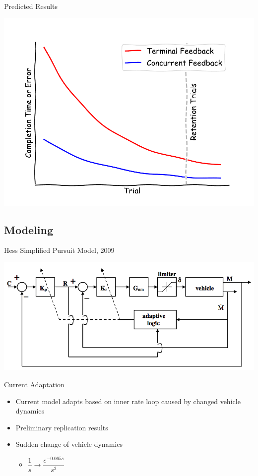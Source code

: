\documentclass[10pt]{beamer}
\begin{document}
\begin{frame}[fragile]{Predicted Results}
  \begin{center}
    \includegraphics[width=\linewidth]{../img/robot_estimate.pdf}
  \end{center}
\end{frame}

\subsection{Modeling}

\begin{frame}[fragile]{Hess Simplified Pursuit Model, 2009~\cite{Hess2009}}
  \begin{center}
    \includegraphics[width=\linewidth]{./../img/Screen_Shot_2018-08-09_at_4.15.24_PM.png}
  \end{center}
\end{frame}

\begin{frame}[fragile]{Current Adaptation}
  \begin{itemize}
    \setlength\itemsep{1em}
    \item Current model adapts based on inner rate loop caused by changed vehicle dynamics
    \item Preliminary replication results
    \item Sudden change of vehicle dynamics
    \begin{itemize}
      \item $\dfrac{1}{s} \rightarrow \dfrac{e^{-0.065s}}{s^2}$
    \end{itemize}
  \end{itemize}
\end{frame}
\end{document}
